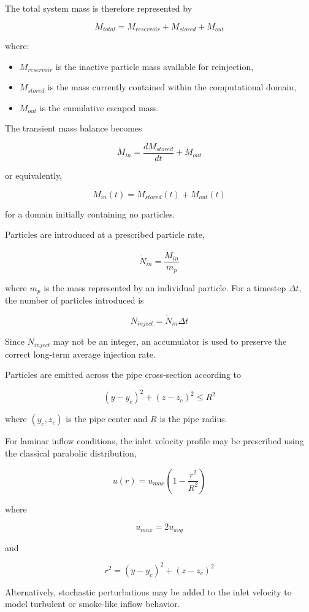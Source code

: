 \documentclass[11pt]{article}
\begin{document}
The total system mass is therefore represented by

\[
M_{total}
=
M_{reservoir}
+
M_{stored}
+
M_{out}
\]

where:

\begin{itemize}
    \item $M_{reservoir}$ is the inactive particle mass available for reinjection,
    \item $M_{stored}$ is the mass currently contained within the computational domain,
    \item $M_{out}$ is the cumulative escaped mass.
\end{itemize}

The transient mass balance becomes

\[
\dot{M}_{in}
=
\frac{dM_{stored}}{dt}
+
\dot{M}_{out}
\]

or equivalently,

\[
M_{in}(t)
=
M_{stored}(t)
+
M_{out}(t)
\]

for a domain initially containing no particles.

Particles are introduced at a prescribed particle rate,

\[
\dot{N}_{in}
=
\frac{\dot{M}_{in}}{m_p}
\]

where $m_p$ is the mass represented by an individual particle. For a timestep $\Delta t$, the number of particles introduced is

\[
N_{inject}
=
\dot{N}_{in}\Delta t
\]

Since $N_{inject}$ may not be an integer, an accumulator is used to preserve the correct long-term average injection rate.

Particles are emitted across the pipe cross-section according to

\[
(y-y_c)^2 + (z-z_c)^2 \le R^2
\]

where $(y_c,z_c)$ is the pipe center and $R$ is the pipe radius.

For laminar inflow conditions, the inlet velocity profile may be prescribed using the classical parabolic distribution,

\[
u(r)
=
u_{max}
\left(
1-\frac{r^2}{R^2}
\right)
\]

where

\[
u_{max}=2u_{avg}
\]

and

\[
r^2=(y-y_c)^2+(z-z_c)^2
\]

Alternatively, stochastic perturbations may be added to the inlet velocity to model turbulent or smoke-like inflow behavior.
\end{document}
